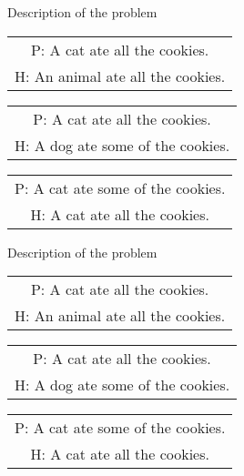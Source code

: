 \documentclass{beamer}
\begin{document}
\begin{frame}{Description of the problem}
  \centering
  
  \color{gray}

  \begin{tabular}{c}
        P: A cat ate all the cookies. \\
        H: An animal ate all the cookies.\\
    \end{tabular}
    
    \bigskip
    
    \color{black}
    \begin{tabular}{c}
        P: A cat ate all the cookies. \\
        H: A dog ate some of the cookies.\\
    \end{tabular}
    
    \bigskip
    
    \color{gray}
    
    \begin{tabular}{c}
        P: A cat ate some of the cookies. \\
        H: A cat ate all the cookies.\\
    \end{tabular}
\end{frame}

\begin{frame}{Description of the problem}
    \centering
  \color{gray}
    \begin{tabular}{c}
        P: A cat ate all the cookies. \\
        H: An animal ate all the cookies.\\
    \end{tabular}
    
    \bigskip
    
    \begin{tabular}{c}
        P: A cat ate all the cookies. \\
        H: A dog ate some of the cookies.\\
    \end{tabular}
    \color{black}
    
    \bigskip
    
    \begin{tabular}{c}
        P: A cat ate some of the cookies. \\
        H: A cat ate all the cookies.\\
        \end{tabular}
\end{frame}
\end{document}
